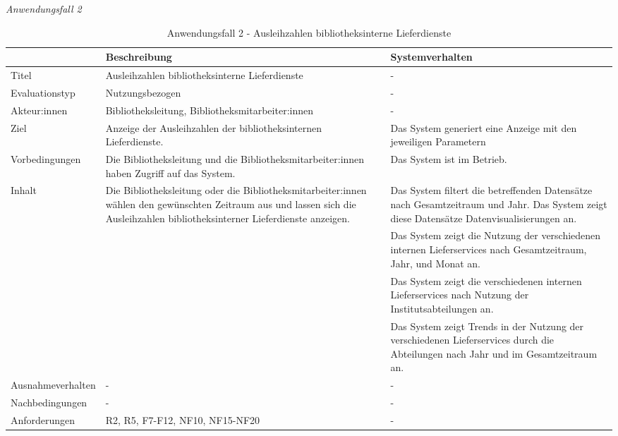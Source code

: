 \newpage
\noindent
\textit{Anwendungsfall 2}


\begingroup
\setlength{\tabcolsep}{10pt} %
\renewcommand{\arraystretch}{1.25} 
\begin{table}[h]
    \centering
    \begin{adjustbox}{max width=\textwidth}
    \begin{tabular}{lp{7.0cm}p{7.0cm}}
       \toprule
       \textbf{}          & \textbf{Beschreibung} &\textbf{Systemverhalten}\\
       \midrule
        Titel                            &Ausleihzahlen bibliotheksinterne Lieferdienste& -\\
        Evaluationstyp                   &Nutzungsbezogen                   & -\\
        Akteur:innen                     &Bibliotheksleitung, Bibliotheksmitarbeiter:innen& -\\
        Ziel                             &Anzeige der Ausleihzahlen der bibliotheksinternen Lieferdienste.& Das System generiert eine Anzeige mit den jeweiligen Parametern\\
        Vorbedingungen                   &Die Bibliotheksleitung und die Bibliotheksmitarbeiter:innen haben Zugriff auf das System.& Das System ist im Betrieb.\\
        Inhalt                          &Die Bibliotheksleitung oder die Bibliotheksmitarbeiter:innen wählen den gewünschten Zeitraum aus und lassen sich die Ausleihzahlen bibliotheksinterner Lieferdienste anzeigen. & Das System filtert die betreffenden Datensätze nach Gesamtzeitraum und Jahr. Das System zeigt diese Datensätze Datenvisualisierungen an.\\
                                        & &Das System zeigt die Nutzung der verschiedenen internen Lieferservices nach Gesamtzeitraum, Jahr, und Monat an.\\
                                        & &Das System zeigt die verschiedenen internen Lieferservices nach Nutzung der Institutsabteilungen an.\\
                                        & &Das System zeigt Trends in der Nutzung der verschiedenen Lieferservices  durch die Abteilungen nach Jahr und im Gesamtzeitraum an.\\
        Ausnahmeverhalten               &- & -\\
        Nachbedingungen                 &-& -\\
        Anforderungen                   &R2, R5, F7-F12, NF10, NF15-NF20& -\\
        \bottomrule
    \end{tabular}
    \end{adjustbox}
    \caption{%
    Anwendungsfall 2 - Ausleihzahlen bibliotheksinterne Lieferdienste
    }
    \label{tab:AF_Lieferdienste}
    \end{table}
